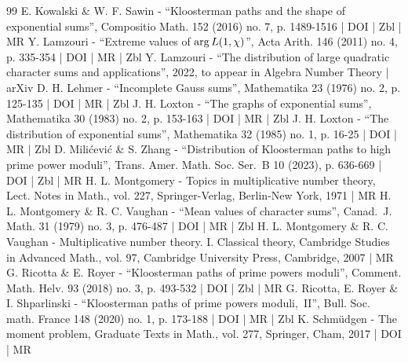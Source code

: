 \begin{thebibliography}{99}
E. Kowalski \& W. F. Sawin - “Kloosterman paths and the shape of exponential sums”, Compositio Math. 152 (2016) no. 7, p. 1489-1516 | DOI | Zbl | MR
Y. Lamzouri - “Extreme values of ${\rm arg}\,L(1,\chi )$”, Acta Arith. 146 (2011) no. 4, p. 335-354 | DOI | MR | Zbl
Y. Lamzouri - “The distribution of large quadratic character sums and applications”, 2022, to appear in Algebra Number Theory | arXiv
D. H. Lehmer - “Incomplete Gauss sums”, Mathematika 23 (1976) no. 2, p. 125-135 | DOI | MR | Zbl
J. H. Loxton - “The graphs of exponential sums”, Mathematika 30 (1983) no. 2, p. 153-163 | DOI | MR | Zbl
J. H. Loxton - “The distribution of exponential sums”, Mathematika 32 (1985) no. 1, p. 16-25 | DOI | MR | Zbl
D. Milićević \& S. Zhang - “Distribution of Kloosterman paths to high prime power moduli”, Trans. Amer. Math. Soc. Ser. B 10 (2023), p. 636-669 | DOI | Zbl | MR
H. L. Montgomery - Topics in multiplicative number theory, Lect. Notes in Math., vol. 227, Springer-Verlag, Berlin-New York, 1971 | MR
H. L. Montgomery \& R. C. Vaughan - “Mean values of character sums”, Canad. J. Math. 31 (1979) no. 3, p. 476-487 | DOI | MR | Zbl
H. L. Montgomery \& R. C. Vaughan - Multiplicative number theory. I. Classical theory, Cambridge Studies in Advanced Math., vol. 97, Cambridge University Press, Cambridge, 2007 | MR
G. Ricotta \& E. Royer - “Kloosterman paths of prime powers moduli”, Comment. Math. Helv. 93 (2018) no. 3, p. 493-532 | DOI | Zbl | MR
G. Ricotta, E. Royer \& I. Shparlinski - “Kloosterman paths of prime powers moduli, II”, Bull. Soc. math. France 148 (2020) no. 1, p. 173-188 | DOI | MR | Zbl
K. Schmüdgen - The moment problem, Graduate Texts in Math., vol. 277, Springer, Cham, 2017 | DOI | MR
\end{thebibliography}
